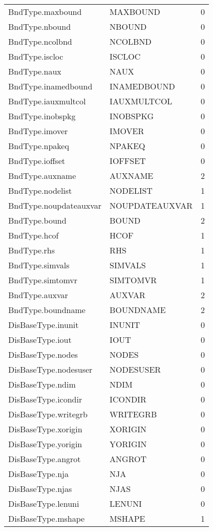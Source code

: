 \begin{longtable}{p{6cm} p{4cm} p{2cm} }
BndType.maxbound &  MAXBOUND & 0 \\ 
BndType.nbound &  NBOUND & 0 \\ 
BndType.ncolbnd &  NCOLBND & 0 \\ 
BndType.iscloc &  ISCLOC & 0 \\ 
BndType.naux &  NAUX & 0 \\ 
BndType.inamedbound &  INAMEDBOUND & 0 \\ 
BndType.iauxmultcol &  IAUXMULTCOL & 0 \\ 
BndType.inobspkg &  INOBSPKG & 0 \\ 
BndType.imover &  IMOVER & 0 \\ 
BndType.npakeq &  NPAKEQ & 0 \\ 
BndType.ioffset &  IOFFSET & 0 \\ 
BndType.auxname &  AUXNAME & 2 \\ 
BndType.nodelist &  NODELIST & 1 \\ 
BndType.noupdateauxvar &  NOUPDATEAUXVAR & 1 \\ 
BndType.bound &  BOUND & 2 \\ 
BndType.hcof &  HCOF & 1 \\ 
BndType.rhs &  RHS & 1 \\ 
BndType.simvals &  SIMVALS & 1 \\ 
BndType.simtomvr &  SIMTOMVR & 1 \\ 
BndType.auxvar &  AUXVAR & 2 \\ 
BndType.boundname & BOUNDNAME & 2 \\ 
DisBaseType.inunit &  INUNIT & 0 \\ 
DisBaseType.iout &  IOUT & 0 \\ 
DisBaseType.nodes &  NODES & 0 \\ 
DisBaseType.nodesuser &  NODESUSER & 0 \\ 
DisBaseType.ndim &  NDIM & 0 \\ 
DisBaseType.icondir &  ICONDIR & 0 \\ 
DisBaseType.writegrb &  WRITEGRB & 0 \\ 
DisBaseType.xorigin &  XORIGIN & 0 \\ 
DisBaseType.yorigin &  YORIGIN & 0 \\ 
DisBaseType.angrot &  ANGROT & 0 \\ 
DisBaseType.nja &  NJA & 0 \\ 
DisBaseType.njas &  NJAS & 0 \\ 
DisBaseType.lenuni &  LENUNI & 0 \\ 
DisBaseType.mshape &  MSHAPE & 1 \\ 

\end{longtable}
